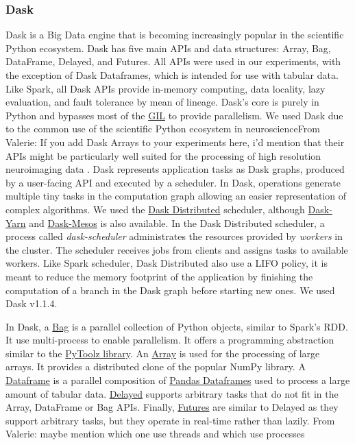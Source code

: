 \documentclass[conference]{IEEEtran}
\newcommand{\VHS}[1]{\color{green}From Valerie: #1 \color{black}}
\begin{document}
\subsubsection{Dask} Dask is a Big Data engine that is becoming increasingly popular
in the scientific Python ecosystem. Dask has five main APIs and data structures:
Array, Bag, DataFrame, Delayed, and Futures. All APIs were used in our experiments,
with the exception of Dask Dataframes, which is intended for use with tabular data.
Like Spark, all Dask APIs provide
in-memory computing, data locality, lazy evaluation, and fault tolerance by mean of
lineage. Dask's core is purely in Python and bypasses most of the
\href{https://docs.python.org/3/glossary.html#term-gil}{GIL} to provide parallelism.
We used Dask due to the common use of the scientific Python ecosystem in
neuroscience\VHS{If you add Dask Arrays to your experiments here, i'd mention that their
APIs might be particularly well suited for the processing of high resolution neuroimaging data}. Dask represents application tasks as Dask graphs, produced by a
user-facing API and executed by a scheduler. In Dask, operations generate multiple
tiny tasks in the computation graph allowing an easier representation of complex
algorithms. We used the \href{https://distributed.dask.org/en/latest/index.html}{Dask
Distributed} scheduler, although \href{https://github.com/dask/dask-yarn}{Dask-Yarn}
and \href{https://github.com/mrocklin/dask-mesos}{Dask-Mesos} is also available. In
the Dask Distributed scheduler, a process called \textit{dask-scheduler}
administrates the resources provided by \textit{workers} in the cluster. The
scheduler receives jobs from clients and assigns tasks to available workers. Like
Spark scheduler, Dask Distributed also use a LIFO policy, it is meant to reduce the
memory footprint of the application by finishing the computation of a branch in the
Dask graph before starting new ones. We used Dask v1.1.4. 

In Dask, a \href{https://docs.dask.org/en/latest/bag.html}{Bag} is a parallel
collection of Python objects, similar to Spark's RDD. It use multi-process to enable
parallelism. It offers a programming abstraction similar to the
\href{https://toolz.readthedocs.io/en/latest/}{PyToolz library}. An
\href{https://docs.dask.org/en/latest/array.html}{Array} is used for the processing
of large arrays. It provides a distributed clone of the popular NumPy library. A
\href{https://docs.dask.org/en/latest/dataframe.html}{Dataframe} is a parallel
composition of
\href{http://pandas.pydata.org/pandas-docs/stable/reference/api/pandas.DataFrame.html}{Pandas
Dataframes} used to process a large amount of tabular data.
\href{https://docs.dask.org/en/latest/delayed.html}{Delayed} supports arbitrary tasks
that do not fit in the Array, DataFrame or Bag APIs. Finally,
\href{https://docs.dask.org/en/latest/futures.html}{Futures} are similar to Delayed
as they support arbitrary tasks, but they operate in real-time rather than lazily.
\VHS{maybe mention which one use threads and which use processes}
\end{document}
